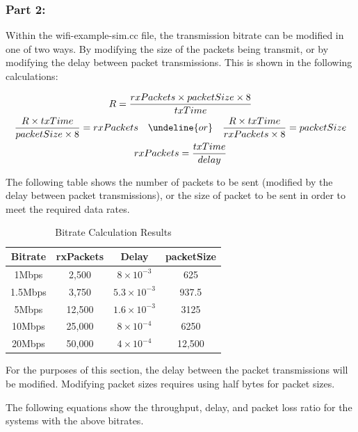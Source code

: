 \subsubsection{Part 2:}

Within the wifi-example-sim.cc file, the transmission bitrate can be modified in
one of two ways. By modifying the size of the packets being transmit, or by
modifying the delay between packet transmissions. This is shown in the following
calculations:

\begin{gather*}
	R=\frac{rxPackets\times packetSize \times 8}{txTime} \\
	\begin{align*}
		\frac{R\times txTime}{packetSize \times 8} &= rxPackets &
		\undeline{or}& & \frac{R \times txTime}{rxPackets
	\times 8} &= packetSize \\
	\end{align*} \\
	rxPackets=\frac{txTime}{delay}
\end{gather*}

The following table shows the number of packets to be sent (modified by the
delay between packet transmissions), or the size of packet to be sent in order
to meet the required data rates.

\begin{table}[H]
	\centering
	\caption{Bitrate Calculation Results}
	\label{tab:brcalc}
	\begin{tabular}{|c|c|c|c|}
	\hline
	Bitrate & rxPackets & Delay & packetSize \\
	\hline
	1Mbps & 2,500 & $8\times 10^{-3}$ & 625 \\
	1.5Mbps & 3,750 & $5.3\times 10^{-3}$ & 937.5 \\
	5Mbps & 12,500 & $1.6\times 10^{-3}$ & 3125 \\
	10Mbps & 25,000 & $8\times 10^{-4}$ & 6250 \\
	20Mbps & 50,000 & $4\times 10^{-4}$ & 12,500 \\
	\hline
	\end{tabular}
\end{table}

For the purposes of this section, the delay between the packet transmissions
will be modified. Modifying packet sizes requires using half bytes for packet
sizes.

\par The following equations show the throughput, delay, and packet loss ratio
for the systems with the above bitrates.

